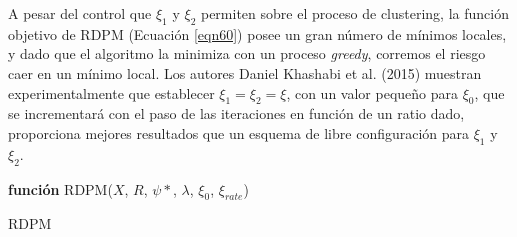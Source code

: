 A pesar del control que $\xi_1$ y $\xi_2$ permiten sobre el proceso de clustering, la función objetivo de \acs{RDPM} (Ecuación \ref{eqn60}) posee un gran número de mínimos locales, y dado que el algoritmo la minimiza con un proceso \textit{greedy}, corremos el riesgo caer en un mínimo local. Los autores Daniel Khashabi et al. (2015) \cite{RDPM:2015} muestran experimentalmente que establecer $\xi_1 = \xi_2 = \xi$, con un valor pequeño para $\xi_0$, que se incrementará con el paso de las iteraciones en función de un ratio dado, proporciona mejores resultados que un esquema de libre configuración para $\xi_1$ y $\xi_2$.

\begin{algorithm}
	\BlankLine
	\BlankLine
	\textbf{función} RDPM($X$, $R$, $\psi*$, $\lambda$, $\xi_0$, $\xi_{rate}$) 
	\caption{\acf{RDPM}}
	\label{alg:rdpm}
\end{algorithm}










